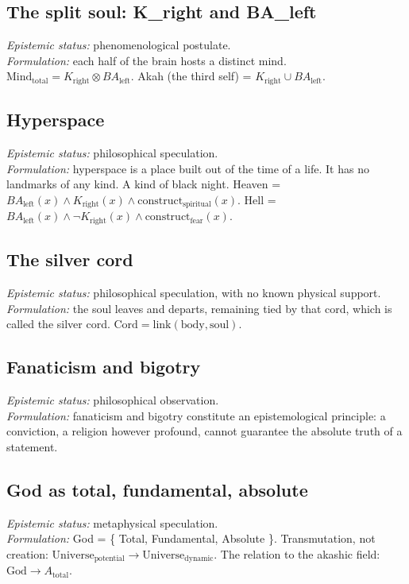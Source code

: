 \documentclass[11pt,a4paper]{article}
\begin{document}
\subsection{The split soul: K\_right and BA\_left}
\textit{Epistemic status:} phenomenological postulate. \\
\textit{Formulation:} each half of the brain hosts a distinct mind. $\text{Mind}_{\text{total}} = K_{\text{right}} \otimes BA_{\text{left}}$. Akah (the third self) = $K_{\text{right}} \cup BA_{\text{left}}$.

\subsection{Hyperspace}
\textit{Epistemic status:} philosophical speculation. \\
\textit{Formulation:} hyperspace is a place built out of the time of a life. It has no landmarks of any kind. A kind of black night. Heaven = $BA_{\text{left}}(x) \land K_{\text{right}}(x) \land \text{construct}_{\text{spiritual}}(x)$. Hell = $BA_{\text{left}}(x) \land \neg K_{\text{right}}(x) \land \text{construct}_{\text{fear}}(x)$.

\subsection{The silver cord}
\textit{Epistemic status:} philosophical speculation, with no known physical support. \\
\textit{Formulation:} the soul leaves and departs, remaining tied by that cord, which is called the silver cord. $\text{Cord} = \text{link}(\text{body}, \text{soul})$.

\subsection{Fanaticism and bigotry}
\textit{Epistemic status:} philosophical observation. \\
\textit{Formulation:} fanaticism and bigotry constitute an epistemological principle: a conviction, a religion however profound, cannot guarantee the absolute truth of a statement.

\subsection{God as total, fundamental, absolute}
\textit{Epistemic status:} metaphysical speculation. \\
\textit{Formulation:} God = \{ Total, Fundamental, Absolute \}. Transmutation, not creation: $\text{Universe}_{\text{potential}} \to \text{Universe}_{\text{dynamic}}$. The relation to the akashic field: $\text{God} \to A_{\text{total}}$.
\end{document}

